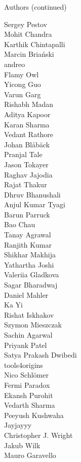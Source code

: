 \begin{frame}{Authors (continued)}
\begin{multicols}{5}
\tiny
Sergey Pestov\\
Mohit Chandra\\
Karthik Chintapalli\\
Marcin Briański\\
andreo\\
Flamy Owl\\
Yicong Guo\\
Varun Garg\\
Rishabh Madan\\
Aditya Kapoor\\
Karan Sharma\\
Vedant Rathore\\
Johan Blåbäck\\
Pranjal Tale\\
Jason Tokayer\\
Raghav Jajodia\\
Rajat Thakur\\
Dhruv Bhanushali\\
Anjul Kumar Tyagi\\
Barun Parruck\\
Bao Chau\\
Tanay Agrawal\\
Ranjith Kumar\\
Shikhar Makhija\\
Yathartha Joshi\\
Valeriia Gladkova\\
Sagar Bharadwaj\\
Daniel Mahler\\
Ka Yi\\
Rishat Iskhakov\\
Szymon Mieszczak\\
Sachin Agarwal\\
Priyank Patel\\
Satya Prakash Dwibedi\\
tools4origins\\
Nico Schlömer\\
Fermi Paradox\\
Ekansh Purohit\\
Vedarth Sharma\\
Peeyush Kushwaha\\
Jayjayyy\\
Christopher J. Wright\\
Jakub Wilk\\
Mauro Garavello\\

\end{multicols}
\end{frame}
